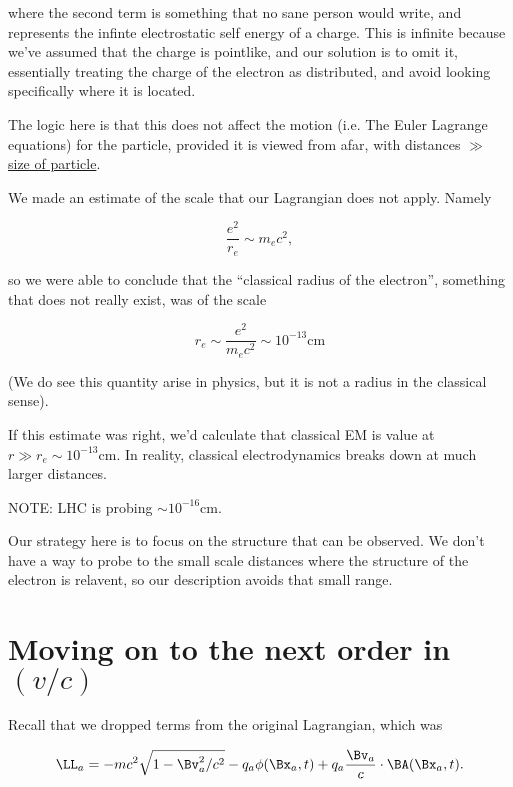 where the second term is something that no sane person would write, and represents the infinte electrostatic self energy of a charge.  This is infinite because we've assumed that the charge is pointlike, and our solution is to omit it, essentially treating the charge of the electron as distributed, and avoid looking specifically where it is located.

The logic here is that this does not affect the motion (i.e. The Euler Lagrange equations) for the particle, provided it is viewed from afar, with distances $\gg$ \underline{size of particle}.

We made an estimate of the scale that our Lagrangian does not apply.  Namely

\begin{equation}\label{eqn:relativisticElectrodynamicsL25:n}
\frac{e^2}{r_e} \sim m_e c^2,
\end{equation}

so we were able to conclude that the ``classical radius of the electron'', something that does not really exist, was of the scale

\begin{equation}\label{eqn:relativisticElectrodynamicsL25:n}
r_e \sim \frac{e^2 }{m_e c^2} \sim 10^{-13} \text{cm}
\end{equation}

(We do see this quantity arise in physics, but it is not a radius in the classical sense).

If this estimate was right, we'd calculate that classical EM is value at $r \gg r_e \sim 10^{-13} \text{cm}$.  In reality, classical electrodynamics breaks down at much larger distances.

NOTE: LHC is probing $\sim 10^{-16} \text{cm}$.

Our strategy here is to focus on the structure that can be observed.  We don't have a way to probe to the small scale distances where the structure of the electron is relavent, so our description avoids that small range.

\section{Moving on to the next order in $(v/c)$}

Recall that we dropped terms from the original Lagrangian, which was

\begin{equation}\label{eqn:relativisticElectrodynamicsL25:n}
\LL_a = - m c^2 \sqrt{ 1 - \Bv_a^2/c^2} - q_a \phi(\Bx_a, t) + q_a \frac{\Bv_a}{c} \cdot \BA(\Bx_a, t).
\end{equation}


